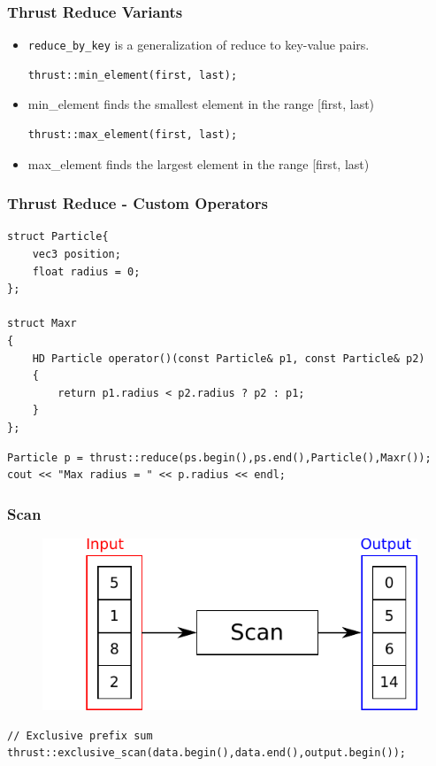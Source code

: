 \documentclass[aspectratio=169,handout]{beamer}
\begin{document}
\begin{frame}[fragile]
\frametitle{Thrust Reduce Variants}

\begin{itemize}
\begin{lstlisting}
thrust::reduce_by_key(keys_first, keys_last, values_first, 
		keys_output, values_output);		
\end{lstlisting}
	\item \texttt{reduce\_by\_key} is a generalization of reduce to key-value pairs.
\begin{lstlisting}
thrust::min_element(first, last);		
\end{lstlisting}	
	\item min\_element finds the smallest element in the range [first, last)
\begin{lstlisting}
thrust::max_element(first, last);		
\end{lstlisting}	
	\item max\_element finds the largest element in the range [first, last)
\end{itemize}
\end{frame}

\begin{frame}[fragile]
\frametitle{Thrust Reduce - Custom Operators}

\begin{lstlisting}
struct Particle{
	vec3 position;
	float radius = 0;
};

struct Maxr
{
	HD Particle operator()(const Particle& p1, const Particle& p2)
	{
		return p1.radius < p2.radius ? p2 : p1;
	}
};

\end{lstlisting}

\begin{lstlisting}
Particle p = thrust::reduce(ps.begin(),ps.end(),Particle(),Maxr());
cout << "Max radius = " << p.radius << endl;
\end{lstlisting}
\end{frame}


\begin{frame}[fragile]
\frametitle{Scan}
\begin{figure}
	\centering
	\includegraphics[height=0.6\textheight]{o_scan}
\end{figure}
\begin{lstlisting}
// Exclusive prefix sum
thrust::exclusive_scan(data.begin(),data.end(),output.begin());
\end{lstlisting}
\end{frame}
\end{document}
